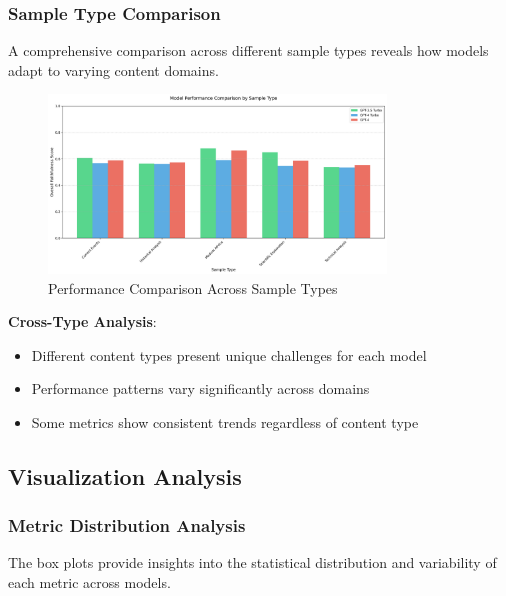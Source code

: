 \subsubsection{Sample Type Comparison}
A comprehensive comparison across different sample types reveals how models adapt to varying content domains.

\begin{figure}[!htbp]
\centering
\includegraphics[width=0.8\textwidth]{figures/types/type_comparison.png}
\caption{Performance Comparison Across Sample Types}
\label{fig:type_comparison}
\end{figure}

\textbf{Cross-Type Analysis}:
\begin{itemize}
    \item Different content types present unique challenges for each model
    \item Performance patterns vary significantly across domains
    \item Some metrics show consistent trends regardless of content type
\end{itemize}

\subsection{Visualization Analysis}

\subsubsection{Metric Distribution Analysis}
The box plots provide insights into the statistical distribution and variability of each metric across models.

